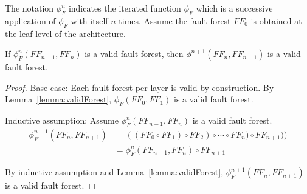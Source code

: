 The notation $\phi_F^n$ indicates the iterated function $\phi_F$ which is a successive application of $\phi_F$ with itself $n$ times. Assume the fault forest $\mathit{FF_0}$ is obtained at the leaf level of the architecture.

\begin{theorem} If $\phi_F^n(\mathit{FF_{n-1}}, \mathit{FF_n})$ is a valid fault forest, then $\phi^{n+1}(\mathit{FF_n}, \mathit{FF_{n+1}})$ is a valid fault forest.
\begin{proof}

Base case: Each fault forest per layer is valid by construction. By Lemma~\ref{lemma:validForest}, $\phi_F(\mathit{FF_0}, \mathit{FF_1})$ is a valid fault forest.

Inductive assumption: Assume $\phi_F^n(\mathit{FF_{n-1}}, \mathit{FF_n})$ is a valid fault forest.
\begin{equation*}
\begin{split}
\phi_F^{n+1}(\mathit{FF_n}, \mathit{FF_{n+1}}) &= ((\mathit{FF_0} \circ \mathit{FF_1}) \circ \mathit{FF}_2) \circ \cdots \circ \mathit{FF_n}) \circ \mathit{FF_{n+1}})) \\
  &= \phi_F^n(\mathit{FF_{n-1}}, \mathit{FF_n}) \circ \mathit{FF_{n+1}}
\end{split}
\end{equation*}


By inductive assumption and Lemma~\ref{lemma:validForest}, $\phi_F^{n+1}(\mathit{FF_n}, \mathit{FF_{n+1}})$ is a valid fault forest.

\end{proof}
\label{thm:indForest}
\end{theorem}


